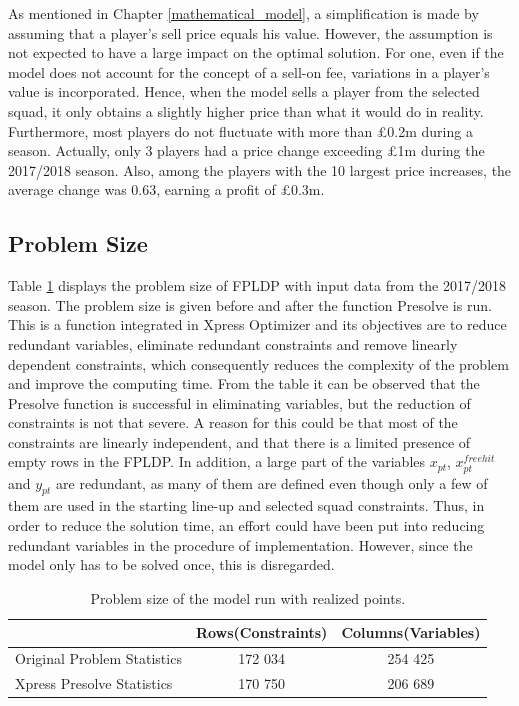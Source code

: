 \newpar

As mentioned in Chapter \ref{mathematical_model}, a simplification is made by assuming that a player's sell price equals his value. However, the assumption is not expected to have a large impact on the optimal solution. For one, even if the model does not account for the concept of a sell-on fee, variations in a player's value is incorporated. Hence, when the model sells a player from the selected squad, it only obtains a slightly higher price than what it would do in reality. Furthermore, most players do not fluctuate with more than \pounds 0.2m during a season. Actually, only 3 players had a price change exceeding \pounds 1m during the 2017/2018 season. Also, among the players with the 10 largest price increases, the average change was 0.63, earning a profit of \pounds 0.3m.


\subsection{Problem Size}

Table \ref{tab:computational_statistics} displays the problem size of FPLDP with input data from the 2017/2018 season. The problem size is given before and after the function Presolve is run. This is a function integrated in Xpress Optimizer and its objectives are to reduce redundant variables, eliminate redundant constraints and remove linearly dependent constraints, which consequently reduces the complexity of the problem and improve the computing time. From the table it can be observed that the Presolve function is successful in eliminating variables, but the reduction of constraints is not that severe. A reason for this could be that most of the constraints are linearly independent, and that there is a limited presence of empty rows in the FPLDP. In addition, a large part of the variables $x_{pt}$, $x_{pt}^{freehit}$ and $y_{pt}$ are redundant, as many of them are defined even though only a few of them are used in the starting line-up and selected squad constraints. Thus, in order to reduce the solution time, an effort could have been put into reducing redundant variables in the procedure of implementation. However, since the model only has to be solved once, this is disregarded. 


\begin{table}[H]
\centering
\begin{tabular}{@{}lcc@{}}
\toprule
                            & Rows(Constraints)    & Columns(Variables) 
                            \\ \midrule
Original Problem Statistics & 172 034 & 254 425   \\
Xpress Presolve Statistics  & 170 750 & 206 689   \\ 
\bottomrule
\end{tabular}
\caption{Problem size of the model run with realized points.}
\label{tab:computational_statistics}
\end{table}


